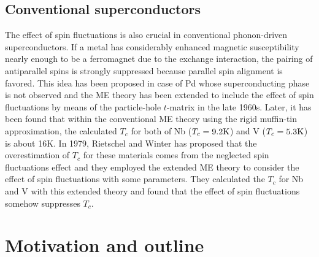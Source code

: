 \subsection{Conventional superconductors}
The effect of spin fluctuations is also crucial in conventional phonon-driven superconductors.
If a metal has considerably enhanced magnetic susceptibility nearly enough to be a ferromagnet
due to the exchange interaction, the pairing of antiparallel spins is strongly suppressed because
parallel spin alignment is favored. This idea has been proposed in case of Pd whose superconducting phase
is not observed\cite{Parks1969} and the ME theory has been extended to include the effect of spin 
fluctuations by means of the particle-hole $t$-matrix in the late 1960s\cite{Berk1966, Schrieffer1968}.
Later, it has been found that within the conventional ME theory using the rigid muffin-tin approximation, 
the calculated $T_c$ for both of Nb 
($T_c = 9.2 \rm K$) and V ($T_c = 5.3 \rm K$) is about 16K\cite{Papa1977}.
In 1979, Rietschel and Winter\cite{Rietschel1979} has proposed that the overestimation of $T_c$ for 
these materials comes from the neglected spin fluctuations effect and they employed the extended ME 
theory to consider the effect of spin fluctuations with some parameters. They calculated the $T_c$ 
for Nb and V with this extended theory and found that the effect of spin fluctuations somehow suppresses $T_c$. 

\section{Motivation and outline}

